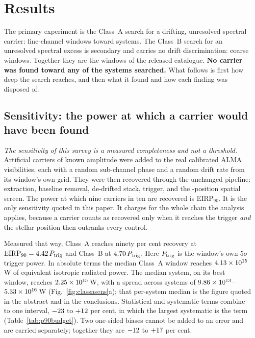 \section{Results}
\label{sec:results}

The primary experiment is the Class~A search for a drifting, unresolved
spectral carrier: \NWinA{} fine-channel windows toward \NSysClassA{}
systems. The Class~B search for an unresolved spectral excess is secondary
and carries no drift discrimination: \NWinB{} coarse windows. Together they
are the \NWindows{} windows of the released catalogue. \textbf{No carrier
was found toward any of the \NSystems{} systems searched.} What follows is
first how deep the search reaches, and then what it found and how each
finding was disposed of.

\subsection{Sensitivity: the power at which a carrier would have been
found} \label{sec:pninetysel}

\emph{The sensitivity of this survey is a measured completeness and not a
threshold.} Artificial carriers of known amplitude were added to the real
calibrated ALMA visibilities, each with a random sub-channel phase and a
random drift rate from its window's own grid. They were then recovered
through the unchanged pipeline: extraction, baseline removal, de-drifted
stack, trigger, and the \NCtrl-position spatial screen. The power at which
nine carriers in ten are recovered is $\mathrm{EIRP}_{90}$. It is the only
sensitivity quoted in this paper. It charges for the whole chain the
analysis applies, because a carrier counts as recovered only when it reaches
the trigger \emph{and} the stellar position then outranks every control.

Measured that way, Class~A reaches ninety per cent recovery at
$\mathrm{EIRP}_{90}=4.42\,P_{\rm trig}$ and Class~B at
$4.70\,P_{\rm trig}$. Here $P_{\rm trig}$ is the window's own
$5\sigma$ trigger power. In absolute terms the median Class~A window reaches
$4.13\times10^{15}$\,W of equivalent isotropic radiated power. The median
system, on its best window, reaches $2.25\times10^{15}$\,W, with a spread
across systems of $9.86\times10^{13}$--$5.33\times10^{16}$\,W
(Fig.~\ref{fig:classasens}a); that per-system median is the figure quoted in
the abstract and in the conclusions. Statistical and systematic terms
combine to one interval, $-23$ to $+12$ per cent, in which
the largest systematic is the \BudDominant{} term
(Table~\ref{tab:p90budget}). Two one-sided biases cannot be added to an
error and are carried separately; together they are $-12$ to
$+17$ per cent.

